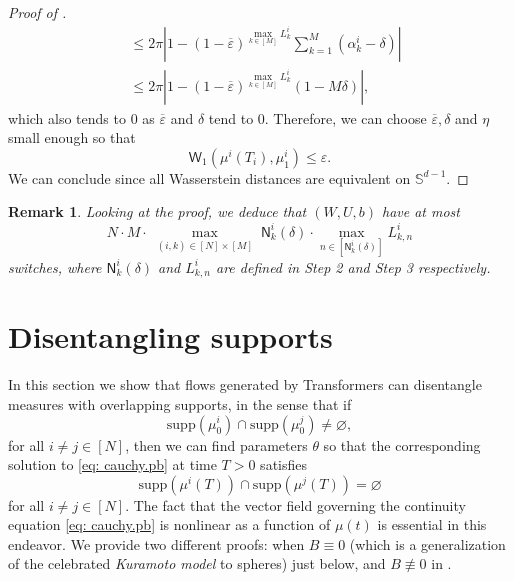 \documentclass[a4paper,11pt]{article}
\theoremstyle{plain}
\newtheorem{remark}[theorem]{Remark}
\newcommand{\supp}{\mathrm{supp}}
\renewcommand{\S}{\mathbb{S}^{d-1}}
\newcommand{\bW}{\bm{\mathit{W}}}
\newcommand{\bB}{\bm{\mathit{B}}}
\newcommand{\bU}{\bm{\mathit{U}}}
\renewcommand{\leq}{\leqslant}
\numberwithin{equation}{section}
\newcommand{\nbbg}[1]{ {\text{\bf bg:} \color{mygrey}{#1}} }
\newcommand{\ndpr}[1]{ {\colorbox{MIT}{\color{white} \textsf{PR}} \color{MIT}{#1}} }
\begin{document}
\begin{proof}[Proof of ]
\begin{align*}
    &\leq 2\pi \left|1-(1-\overline{\varepsilon})^{\max_{k\in[M]} L_k^i}\sum_{k=1}^M(\alpha_k^i-\delta)\right|\\
    &\leq 2\pi \left|1-(1-\overline{\varepsilon})^{\max_{k\in[M]} L_k^i}(1-M\delta)\right|,
\end{align*}
which also tends to 0 as $\overline{\varepsilon}$ and $\delta$ tend to $0$.
Therefore, we can choose $\overline{\varepsilon},\delta$ and $\eta$ small enough so that
\begin{equation*}
    \mathsf{W}_1\left(\mu^i(T_i),\mu_1^i\right)\leq \varepsilon.
\end{equation*}
We can conclude since all Wasserstein distances are equivalent on $\S$.
\end{proof}

\begin{remark} \label{rem: nb.disc.clustering}
    Looking at the proof, we deduce that $(\bW, \bU, b)$ have at most
    \begin{equation*}
    N \cdot M \cdot \max_{\substack{(i, k)\in[N]\times[M]}} \mathsf{N}_k^i(\delta) \cdot \max_{n\in[\mathsf{N}_k^i(\delta)]} L_{k,n}^i 
    \end{equation*}
    switches, where $\mathsf{N}_k^i(\delta)$ and $L_{k, n}^i$ are defined in Step 2 and Step 3 respectively.

\end{remark}


\section{Disentangling supports} \label{sec: disentanglement}

In this section we show that flows generated by Transformers can disentangle measures with overlapping supports, in the sense that if
\begin{equation*}
    \supp(\mu_0^i)\cap \supp(\mu_0^j)\neq\varnothing,
\end{equation*}
for all $i\neq j\in[N]$,
then we can find parameters $\theta$ so that the corresponding solution to \eqref{eq: cauchy.pb} at time $T>0$ satisfies
\begin{equation*}
        \supp(\mu^i(T))\cap \supp(\mu^j(T))=\varnothing
\end{equation*}   
for all $i\neq j\in[N]$.
The fact that the vector field governing the continuity equation \eqref{eq: cauchy.pb} is nonlinear as a function of $\mu(t)$ is essential in this endeavor. We provide two different proofs: when $\bB\equiv0$ (which is a generalization of the celebrated {\it Kuramoto model} to spheres) just below, and $\bB\not\equiv0$ in {\bf {}}.
\end{document}
